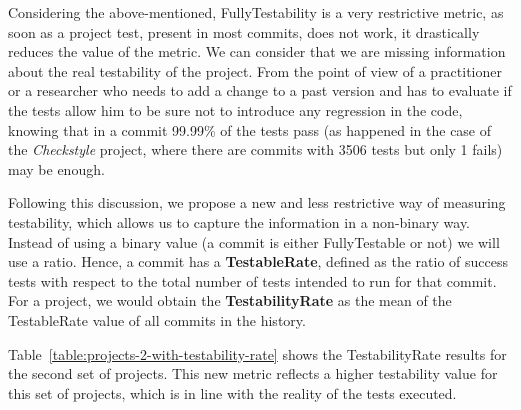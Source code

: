 
Considering the above-mentioned, FullyTestability is a very restrictive metric, as soon as a project test, present in most commits, does not work, it drastically reduces the value of the metric. 
We can consider that we are missing information about the real testability of the project.
From the point of view of a practitioner or a researcher who needs to add a change to a past version and has to evaluate if the tests allow him to be sure not to introduce any regression in the code, knowing that in a commit 99.99\% of the tests pass (as happened in the case of the \textit{Checkstyle} project, where there are commits with 3506 tests but only 1 fails) may be enough.

Following this discussion, we propose a new and less restrictive way of measuring testability, which allows us to capture the information in a non-binary way. 
Instead of using a binary value (a commit is either FullyTestable or not) we will use a ratio. 
Hence, a commit has a \textbf{TestableRate}, defined as the ratio of success tests with respect to the total number of tests intended to run for that commit.
For a project, we would obtain the \textbf{TestabilityRate} as the mean of the TestableRate value of all commits in the history.

Table~\ref{table:projects-2-with-testability-rate} shows the TestabilityRate results for the second set of projects.
This new metric reflects a higher testability value for this set of projects, which is in line with the reality of the tests executed.

